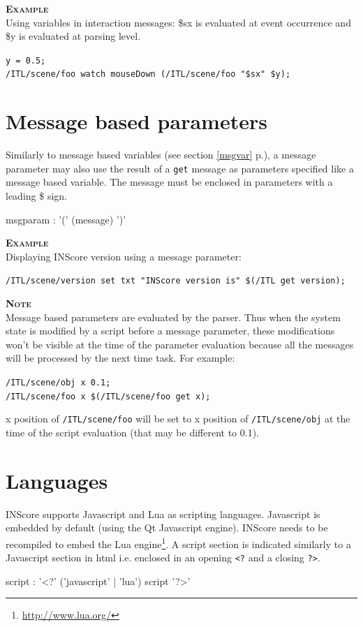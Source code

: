 \documentclass[a4paper,twoside]{report}
\newcommand{\sublevel}[1]	{\section{#1}}
\newcommand{\fullref}[1]	{\ref{#1} p.\pageref{#1}}
\newcommand{\OSC}[1]		{\texttt{#1}}
\newcommand{\example}		{\textbf{\hspace{-1.5cm}\textbf{\textsc{Example }}}}
\newcommand{\note}	[1]		{\vspace{2mm}\textbf{\hspace{-0.9cm}\textbf{\textsc{Note #1}}}}
\newcommand{\sample}	[1]			{\vspace{-2mm}\begin{center}\colorbox{mygrey}{
								\begin{minipage}[t]{0.9\columnwidth} 
								{\small \texttt{#1}}
								\end{minipage}}\end{center}}
\begin{document}
\example \\
Using variables in interaction messages: \$sx is evaluated at event occurrence	and \$y is evaluated at parsing level.
\sample{y = 0.5;\\
/ITL/scene/foo watch mouseDown (/ITL/scene/foo "\$sx" \$y);
}


\sublevel{Message based parameters}\label{scriptmsgparam}

Similarly to message based variables (see section \fullref{msgvar}), a message parameter may also use the result of a \OSC{get} message as parameters specified like a message based variable.
The message must be enclosed in parameters with a leading \$ sign.
\begin{rail} 
msgparam : '(' (message) ')'
\end{rail}

\example \\
Displaying INScore version using a message parameter:
\sample{/ITL/scene/version set  txt "INScore version is" \$(/ITL get version);}

\note{}\\
Message based parameters are evaluated by the parser. Thus when the system state is modified by a script before a message parameter, these modifications won't be visible at the time of the parameter evaluation because all the messages will be processed by the next time task. For example:\\
\sample{/ITL/scene/obj x 0.1;\\
/ITL/scene/foo x \$(/ITL/scene/foo get x);}
x position of \OSC{/ITL/scene/foo} will be set to x position of \OSC{/ITL/scene/obj} at the time of the script evaluation (that may be different to 0.1).

\sublevel{Languages}\label{scriptlang}


INScore supports Javascript and Lua as scripting languages. Javascript is embedded by default (using the Qt Javascript engine). INScore needs to be recompiled to embed the Lua engine\footnote{\url{http://www.lua.org/}}. A script section is indicated similarly to a Javascript section in html i.e. enclosed in an opening \OSC{<?} and a closing \OSC{?>}.
\begin{rail} 
script : '<?' ('javascript' | 'lua') script '?>'
\end{rail}
\end{document}
